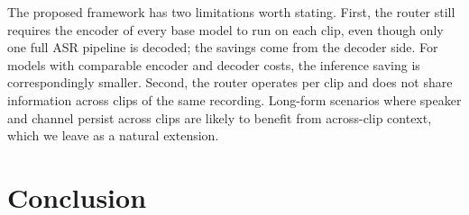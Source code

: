 \documentclass[journal]{IEEEtran}
\begin{document}
The proposed framework has two limitations worth stating. First, the
router still requires the encoder of every base model to run on each
clip, even though only one full ASR pipeline is decoded; the savings
come from the decoder side. For models with comparable encoder and
decoder costs, the inference saving is correspondingly smaller.
Second, the router operates per clip and does not share information
across clips of the same recording. Long-form scenarios where speaker
and channel persist across clips are likely to benefit from
across-clip context, which we leave as a natural extension.

\section{Conclusion}
\label{sec:conclusion}




\end{document}
